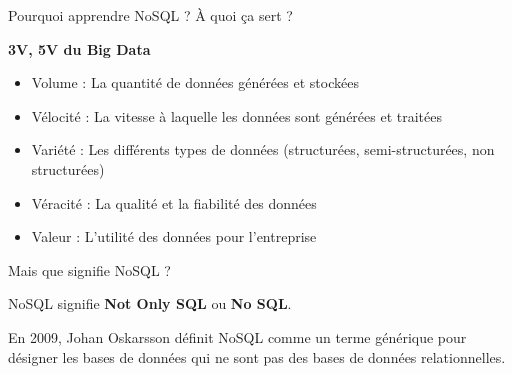 \begin{frame}{Pourquoi apprendre NoSQL ? À quoi ça sert ?}
{        \textbf{3V, 5V du Big Data}

        \begin{itemize}
            \item Volume : La quantité de données générées et stockées
            \item Vélocité : La vitesse à laquelle les données sont générées et traitées
            \item Variété : Les différents types de données (structurées, semi-structurées, non structurées)
            \item Véracité : La qualité et la fiabilité des données
            \item Valeur : L'utilité des données pour l'entreprise
        \end{itemize}

    }

\end{frame}

\begin{frame}{Mais que signifie NoSQL ?}

    \begin{definitionbox}
        NoSQL signifie \textbf{Not Only SQL} ou \textbf{No SQL}.
    \end{definitionbox}

    \pause
    \vspace{0.5cm}

    En 2009, Johan Oskarsson définit NoSQL comme un terme générique pour désigner les bases de données qui ne sont pas des bases de données relationnelles.

\end{frame}

